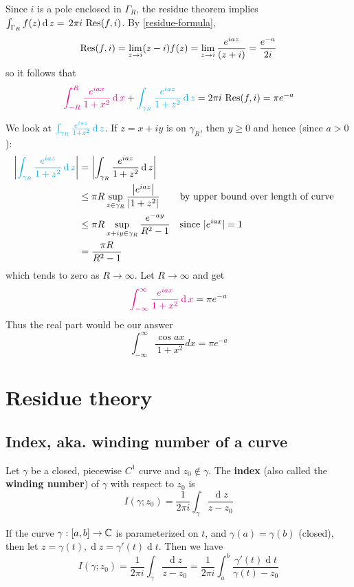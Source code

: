 \documentclass[12pt]{article}
\renewcommand{\d}{\ensuremath{\operatorname{d}}}
\begin{document}
Since $i$ is a pole enclosed in $\Gamma_R$, the residue theorem implies \(\int_{\Gamma_{R}}f(z)\d z=\,2\pi i\,\Res (f,i)\). By \cref{residue-formula}, \[\operatorname{Res} (f,i)=\operatorname*{lim}_{z\rightarrow i}(z-i)f(z)=\operatorname*{lim}_{z\rightarrow i}\frac{e^{i a z}}{(z+i)}=\frac{e^{-a}}{2i}\] so it follows that 
\[\rt{\int_{-R}^{R}{\frac{e^{i a x}}{1+x^{2}}}\d x}+\bt{\int_{\gamma_{R}}{\frac{e^{i a z}}{1+z^{2}}}\d z}=2\pi i\,\Res (f,i)=\pi e^{-a}\]

We look at $\bt{\int_{\gamma_{R}}{\frac{e^{i a z}}{1+z^{2}}}\d z}$. If $z=x+i y$ is on $\gamma_R$, then $y \geq 0$ and hence (since $a>0$):
\[\begin{aligned}
    \left|\bt{\int_{\gamma_{R}}{\frac{e^{i a z}}{1+z^{2}}}\d z}\right| & =\left|\int_{\gamma_R} \frac{e^{i a z}}{1+z^2} \d z\right| \\
    & \leq \pi R \sup _{z \in \gamma_R} \frac{\left|e^{i a z}\right|}{\left|1+z^2\right|} &&\text{by upper bound over length of curve}\\
    & \leq \pi R \sup _{x+i y \in \gamma_R} \frac{e^{-a y}}{R^2-1} &&\text{since }|e^{iax}|=1\\
    & =\frac{\pi R}{R^2-1}
    \end{aligned}\]
which tends to zero as $R \rightarrow \infty$.
Let $R \rightarrow \infty$ and get \[\rt{\int_{-\infty}^{\infty} \frac{e^{i a x}}{1+x^2} \d x}=\pi e^{-a}\] Thus the real part would be our answer \[\int_{-\infty}^{\infty} \frac{\cos a x}{1+x^2} d x=\pi e^{-a}\]

\section{Residue theory}
\subsection{Index, aka. winding number of a curve}
 Let $\gamma$ be a closed, piecewise $C^1$ curve and $z_0\notin \gamma$. The \textbf{index} (also called the \textbf{winding number}) of $\gamma$ with respect to $z_0$ is \[I(\gamma;z_0)=\frac{1}{2\pi i}\int_{\gamma}\frac{\d z}{z-z_0}\]

\rmk If the curve $\gamma:[a,b]\to \mathbb{C}$ is parameterized on $t$, and $\gamma(a)=\gamma(b)$ (closed), then let $z=\gamma(t), \d z=\gamma'(t)\d t$. Then we have \[I(\gamma;z_0)=\frac{1}{2\pi i}\int_{\gamma}\frac{\d z}{z-z_0} = \frac{1}{2\pi i}\int_{a}^{b}\frac{\gamma'(t)\d t}{\gamma(t)-z_0}\]
\end{document}
